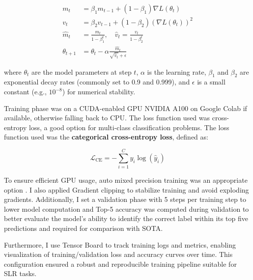 \documentclass{article}
\begin{document}
\begin{equation}
\begin{aligned}
m_t &= \beta_1 m_{t-1} + (1 - \beta_1) \nabla L(\theta_t) \\
v_t &= \beta_2 v_{t-1} + (1 - \beta_2) (\nabla L(\theta_t))^2 \\
\hat{m}_t &= \frac{m_t}{1 - \beta_1^t}, \quad \hat{v}_t = \frac{v_t}{1 - \beta_2^t} \\
\theta_{t+1} &= \theta_t - \alpha \frac{\hat{m}_t}{\sqrt{\hat{v}_t} + \epsilon}
\end{aligned}
\end{equation}

\vspace{0.5cm}

where \( \theta_t \) are the model parameters at step \( t \), \( \alpha \) is the learning rate, \( \beta_1 \) and \( \beta_2 \) are exponential decay rates (commonly set to 0.9 and 0.999), and \( \epsilon \) is a small constant (e.g., \( 10^{-8} \)) for numerical stability.

\vspace{0.5cm}

Training phase was on a CUDA-enabled GPU NVIDIA A100 on Google Colab if available, otherwise falling back to CPU. The loss function used was cross-entropy loss, a good option for multi-class classification problems. The loss function used was the \textbf{categorical cross-entropy loss}, defined as:

\begin{equation}
\mathcal{L}_{\text{CE}} = -\sum_{i=1}^{C} y_i \log(\hat{y}_i)
\end{equation}

\vspace{0.5cm}

To ensure efficient GPU usage, auto mixed precision training was an appropriate option . I also applied Gradient clipping to stabilize training and avoid exploding gradients. Additionally, I set a validation phase with 5 steps per training step to lower model computation and Top-5 accuracy was computed during validation to better evaluate the model’s ability to identify the correct label within its top five predictions and required for comparison with SOTA.

\vspace{0.5cm}

Furthermore, I use Tensor Board to track training logs and metrics, enabling visualization of training/validation loss and accuracy curves over time. This configuration ensured a robust and reproducible training pipeline suitable for SLR tasks.
\end{document}
